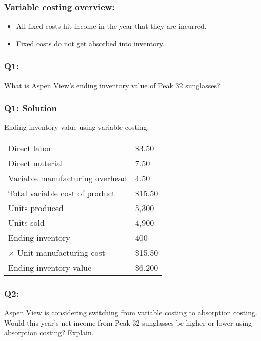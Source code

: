 \hypertarget{variable-costing-overview-1}{%
\subsubsection{Variable costing
overview:}\label{variable-costing-overview-1}}

\begin{itemize}
\tightlist
\item
  All fixed costs hit income in the year that they are incurred.
\item
  Fixed costs do not get absorbed into inventory.
\end{itemize}

\hypertarget{q1}{%
\subsubsection{Q1:}\label{q1}}

What is Aspen View's ending inventory value of Peak 32 sunglasses?

\hypertarget{q1-solution}{%
\subsubsection{Q1: Solution}\label{q1-solution}}

Ending inventory value using variable costing:

\begin{longtable}[]{@{}ll@{}}
\toprule\noalign{}
\endhead
\bottomrule\noalign{}
\endlastfoot
Direct labor & \$3.50 \\
Direct material & 7.50 \\
Variable manufacturing overhead & 4.50 \\
Total variable cost of product & \$15.50 \\
Units produced & 5,300 \\
Units sold & 4,900 \\
Ending inventory & 400 \\
{×} Unit manufacturing cost & \$15.50 \\
Ending inventory value & \$6,200 \\
\end{longtable}

\hypertarget{q2}{%
\subsubsection{Q2:}\label{q2}}

Aspen View is considering switching from variable costing to absorption
costing. Would this year's net income from Peak 32 sunglasses be higher
or lower using absorption costing? Explain.

